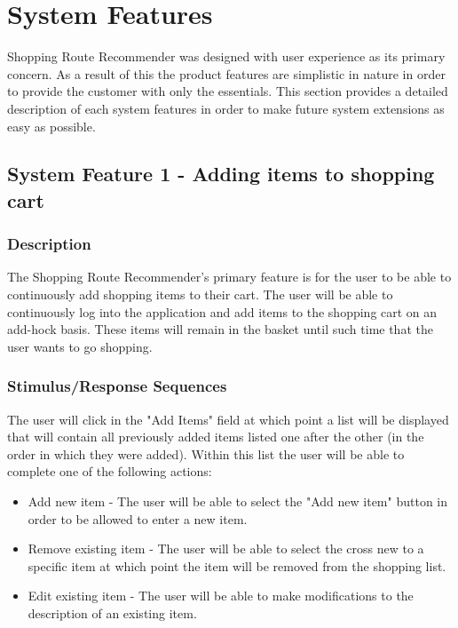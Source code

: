 \documentclass[10pt, a4paper, onecolumn]{scrartcl}
\begin{document}
	\section{System Features}
	
		Shopping Route Recommender was designed with user experience as its primary concern. As a result of this the product features are simplistic in nature in order to provide the customer with only the essentials.	This section provides a detailed description of each system features in order to make future system extensions as easy as possible. 
	
		\subsection{System Feature 1 - Adding items to shopping cart}
		\label{featureadd}
		
			\subsubsection{Description}
			
				The Shopping Route Recommender's primary feature is for the user to be able to continuously add shopping items to their cart. The user will be able to continuously log into the application and add items to the shopping cart on an add-hock basis. These items will remain in the basket until such time that the user wants to go shopping. 
			
			\subsubsection{Stimulus/Response Sequences}
			
				The user will click in the "Add Items" field at which point a list will be displayed that will contain all previously added items listed one after the other (in the order in which they were added). Within this list the user will be able to complete one of the following actions:
				
				\begin{itemize}
					\item Add new item - The user will be able to select the "Add new item" button in order to be allowed to enter a new item. 
					\item Remove existing item - The user will be able to select the cross new to a specific item at which point the item will be removed from the shopping list.
					\item Edit existing item - The user will be able to make modifications to the description of an existing item.
				\end{itemize}
			
\end{document}
